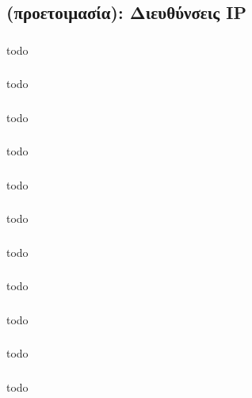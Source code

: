 \documentclass[a4paper, 12pt]{article}
\begin{document}
	\subsection{(προετοιμασία): Διευθύνσεις IP}

		\subsubsection{}
			todo

		\subsubsection{}
			todo

		\subsubsection{}
			todo

		\subsubsection{}
			todo

		\subsubsection{}
			todo

		\subsubsection{}
			todo

		\subsubsection{}
			todo

		\subsubsection{}
			todo

		\subsubsection{}
			todo

		\subsubsection{}
			todo

		\subsubsection{}
			todo
\end{document}
